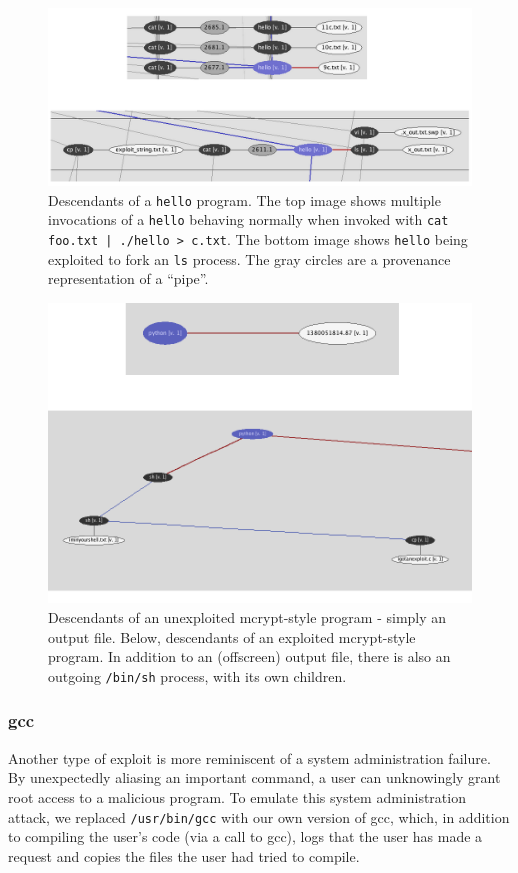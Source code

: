 \documentclass[10pt,twocolumn]{article}
\begin{document}
\begin{figure}
  \label{hello-orbiter}
  \caption{Descendants of a \texttt{hello} program. The top image shows multiple invocations of a \texttt{hello} behaving normally when invoked with \texttt{cat foo.txt | ./hello > c.txt}. The bottom image shows \texttt{hello} being exploited to fork an \texttt{ls} process. The gray circles are a provenance representation of a ``pipe''.} 
  \centering
    \includegraphics[width=\textwidth]{img/hello.png}
\end{figure}
\begin{figure}
  \label{mcrypt-orbiter}
  \caption{Descendants of an unexploited mcrypt-style program - simply an output file. Below, descendants of an exploited mcrypt-style program. In addition to an (offscreen) output file, there is also an outgoing \texttt{/bin/sh} process, with its own children.}
  \centering
    \includegraphics[width=\textwidth]{img/mcrypt.png}
\end{figure}

\subsubsection{gcc}
Another type of exploit is more reminiscent of a system administration failure. By unexpectedly aliasing an important command, a user can unknowingly grant root access to a malicious program. To emulate this system administration attack, we replaced \texttt{/usr/bin/gcc} with our own version of gcc, which, in addition to compiling the user's code (via a call to gcc), logs that the user has made a request and copies the files the user had tried to compile. 
\end{document}
